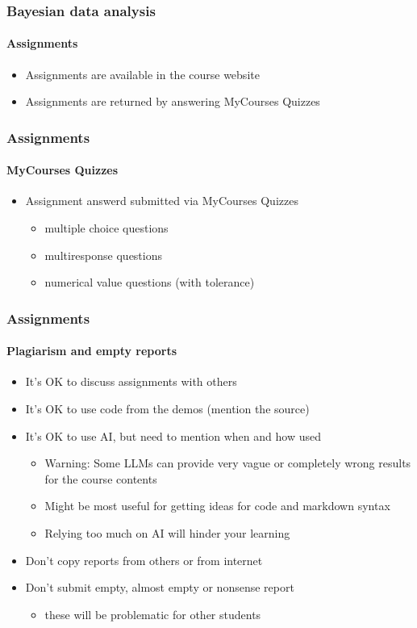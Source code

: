 \documentclass[english,t]{beamer}
\begin{document}
\begin{frame}
  \frametitle{Bayesian data analysis}  %
  \framesubtitle{Assignments}
  \begin{itemize}
  \item Assignments are available in the course website
  \item Assignments are returned by answering MyCourses Quizzes
  \end{itemize}
\end{frame}

\begin{frame}
  \frametitle{Assignments}  %
  \framesubtitle{MyCourses Quizzes}
  \begin{itemize}
  \item Assignment answerd submitted via MyCourses Quizzes
    \begin{itemize}
    \item multiple choice questions
    \item multiresponse questions
    \item numerical value questions (with tolerance)
    \end{itemize}
  \end{itemize}
\end{frame}


\begin{frame}
  \frametitle{Assignments}  %
  \framesubtitle{Plagiarism and empty reports}
  \begin{itemize}
  \item It's OK to discuss assignments with others
  \item It's OK to use code from the demos (mention the source)
  \item It's OK to use AI, but need to mention when and how used
    \begin{itemize}
    \item Warning: Some LLMs can provide very vague
      or completely wrong results for the course contents
    \item Might be most useful for getting ideas for code and markdown syntax
    \item Relying too much on AI will hinder your learning
    \end{itemize}
  \item Don't copy reports from others or from internet
  \item Don't submit empty, almost empty or nonsense report
    \begin{itemize}
    \item these will be problematic for other students
    \end{itemize}
  \end{itemize}
  
\end{frame}
\end{document}
